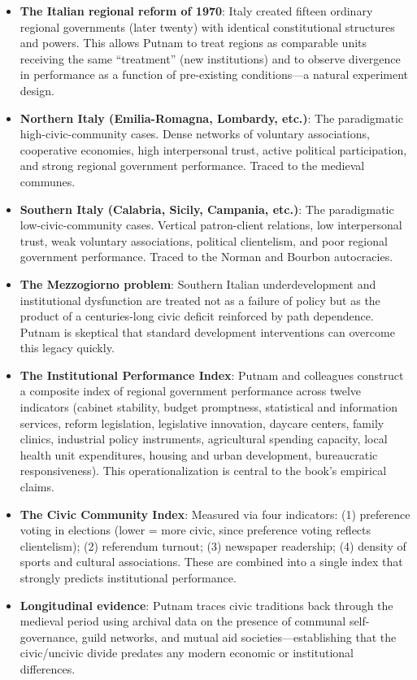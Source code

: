 \documentclass[12pt]{article}
\begin{document}
\begin{itemize}[leftmargin=*, itemsep=4pt]
    \item \textbf{The Italian regional reform of 1970}: Italy created fifteen ordinary regional governments (later twenty) with identical constitutional structures and powers. This allows Putnam to treat regions as comparable units receiving the same ``treatment'' (new institutions) and to observe divergence in performance as a function of pre-existing conditions---a natural experiment design.
    \item \textbf{Northern Italy (Emilia-Romagna, Lombardy, etc.)}: The paradigmatic high-civic-community cases. Dense networks of voluntary associations, cooperative economies, high interpersonal trust, active political participation, and strong regional government performance. Traced to the medieval communes.
    \item \textbf{Southern Italy (Calabria, Sicily, Campania, etc.)}: The paradigmatic low-civic-community cases. Vertical patron-client relations, low interpersonal trust, weak voluntary associations, political clientelism, and poor regional government performance. Traced to the Norman and Bourbon autocracies.
    \item \textbf{The Mezzogiorno problem}: Southern Italian underdevelopment and institutional dysfunction are treated not as a failure of policy but as the product of a centuries-long civic deficit reinforced by path dependence. Putnam is skeptical that standard development interventions can overcome this legacy quickly.
    \item \textbf{The Institutional Performance Index}: Putnam and colleagues construct a composite index of regional government performance across twelve indicators (cabinet stability, budget promptness, statistical and information services, reform legislation, legislative innovation, daycare centers, family clinics, industrial policy instruments, agricultural spending capacity, local health unit expenditures, housing and urban development, bureaucratic responsiveness). This operationalization is central to the book's empirical claims.
    \item \textbf{The Civic Community Index}: Measured via four indicators: (1) preference voting in elections (lower = more civic, since preference voting reflects clientelism); (2) referendum turnout; (3) newspaper readership; (4) density of sports and cultural associations. These are combined into a single index that strongly predicts institutional performance.
    \item \textbf{Longitudinal evidence}: Putnam traces civic traditions back through the medieval period using archival data on the presence of communal self-governance, guild networks, and mutual aid societies---establishing that the civic/uncivic divide predates any modern economic or institutional differences.
\end{itemize}
\end{document}
